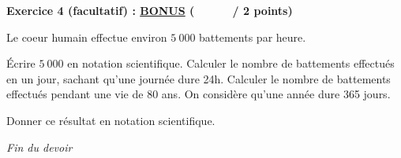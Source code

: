 \documentclass[12pt,a4paper]{exam}
\begin{document}
\vspace{20pt}

\noindent
\textbf{Exercice 4 (facultatif) : \underline{BONUS} (\ \ \ \ \ \  / 2 points)}
\vspace{5pt}

Le coeur humain effectue environ $5\ 000$ battements par heure.

\begin{questions}

    \question Écrire $5\ 000$ en notation scientifique.
    \question Calculer le nombre de battements effectués en un jour, sachant qu'une journée 
    dure 24h.
    \question Calculer le nombre de battements effectués pendant une vie de 80 ans. On considère 
    qu'une année dure 365 jours.
    \vspace{5pt}

    Donner ce résultat en notation scientifique.

\end{questions}

\vspace{20pt}

\begin{center}
    \textit{Fin du devoir}
\end{center}
\end{document}
